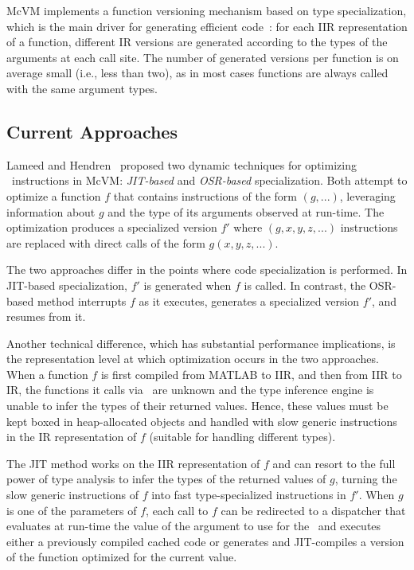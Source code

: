 McVM implements a function versioning mechanism based on type specialization, which is the main driver for generating efficient code~\cite{Chevalier2010}: for each IIR representation of a function, different IR versions are generated according to the types of the arguments at each call site. The number of generated versions per function is on average small (i.e., less than two), as in most cases functions are always called with the same argument types.

\subsection{Current Approaches}
\label{ss:CS-prev-eval-sol}

Lameed and Hendren~\cite{Lameed2013b} proposed two dynamic techniques for optimizing \feval\ instructions in McVM: {\em JIT-based} and {\em OSR-based} specialization. Both attempt to optimize a function $f$ that contains instructions of the form \feval$(g,...)$, leveraging information about $g$ and the type of its arguments observed at run-time. The optimization produces a specialized version $f'$ where \feval$(g,x,y,z,...)$ instructions are replaced with direct calls of the form $g(x,y,z,...)$. 

The two approaches differ in the points where code specialization is performed. In JIT-based specialization, $f'$ is generated when $f$ is called. In contrast, the OSR-based method interrupts $f$ as it executes, generates a specialized version $f'$, and resumes from it.  

Another technical difference, which has substantial performance implications, is the representation level at which optimization occurs in the two approaches. When a function $f$ is first compiled from MATLAB to IIR, and then from IIR to IR, the functions it calls via \feval\ are unknown and the type inference engine is unable to infer the types of their returned values. Hence, these values must be kept boxed in heap-allocated objects and handled with slow generic instructions in the IR representation of $f$ (suitable for handling different types).

The JIT method works on the IIR representation of $f$ and can resort to the full power of type analysis to infer the types of the returned values of $g$, turning the slow generic instructions of $f$ into fast type-specialized instructions in $f'$. When $g$ is one of the parameters of $f$, each call to $f$ can be redirected to a dispatcher that evaluates at run-time the value of the argument to use for the \feval\ and executes either a previously compiled cached code or generates and JIT-compiles a version of the function optimized for the current value.


